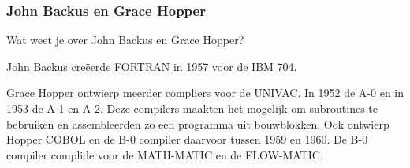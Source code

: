\documentclass[../main.tex]{subfiles}
\begin{document}
\subsubsection{John Backus en Grace Hopper}
\begin{question}
Wat weet je over John Backus en Grace Hopper?
\end{question}
\begin{solution}
John Backus cre\"eerde FORTRAN in 1957 voor de IBM 704.

Grace Hopper ontwierp meerder compliers voor de UNIVAC.
In 1952 de A-0 en in 1953 de A-1 en A-2.
Deze compilers maakten het mogelijk om subroutines te bebruiken en assembleerden zo een programma uit bouwblokken.
Ook ontwierp Hopper COBOL en de B-0 compiler daarvoor tussen 1959 en 1960.
De B-0 compiler complide voor de MATH-MATIC en de FLOW-MATIC.
\end{solution}
\end{document}
